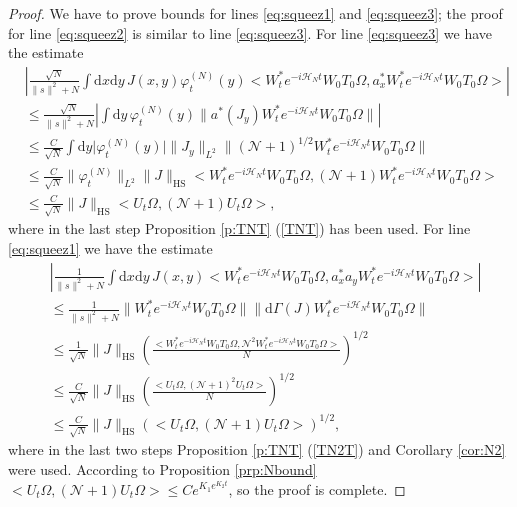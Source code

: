 \documentclass[11pt,a4paper,DIV11]{scrartcl}	%
\newcommand{\di}{\textrm{d}}		%
\newcommand{\Ncal}{\mathcal{N}}		%
\newcommand{\Hcal}{\mathcal{H}}		%
\newcommand{\scal}[2]{\big<#1,#2\big>} %
\newcommand{\norm}[1]{\lVert#1\rVert}	%
\newcommand{\ph}{\varphi_t^{(N)}}	%
\newcommand{\HS}{_{\textrm{HS}}}
\begin{document}
\begin{proof}
We have to prove bounds for lines \eqref{eq:squeez1} and \eqref{eq:squeez3}; the proof for line \eqref{eq:squeez2} is similar to line \eqref{eq:squeez3}.
For line \eqref{eq:squeez3} we have the estimate
\begin{align*}
& \left\lvert \frac{\sqrt{N}}{\norm{s}^2+N} \int \di x\di y\, J(x,y) \ph(y) \scal{W^\ast_t e^{-i\Hcal_N t}W_0 T_0 \Omega}{a^\ast_x W^\ast_t e^{-i\Hcal_N t}W_0 T_0 \Omega}  \right\rvert \\
& \leq \frac{\sqrt{N}}{\norm{s}^2+N}\left\lvert \int \di y\, \ph(y) \norm{a^\ast(J_y)W^\ast_t e^{-i\Hcal_N t} W_0 T_0 \Omega} \right\rvert\\
& \leq \frac{C}{\sqrt{N}} \int \di y \lvert \ph(y)\rvert \norm{J_y}_{L^2} \norm{(\Ncal+1)^{1/2} W^\ast_t e^{-i\Hcal_N t}W_0 T_0 \Omega} \\
& \leq \frac{C}{\sqrt{N}} \norm{\ph}_{L^2} \norm{J}\HS \scal{W^\ast_t e^{-i\Hcal_N t}W_0 T_0 \Omega}{(\Ncal+1)W^\ast_t e^{-i\Hcal_N t}W_0 T_0 \Omega} \\
& \leq \frac{C}{\sqrt{N}} \norm{J}\HS \scal{U_t \Omega}{(\Ncal+1)U_t \Omega},
\end{align*}
where in the last step Proposition \ref{p:TNT} (\ref{TNT}) has been used.
For line \eqref{eq:squeez1} we have the estimate
\begin{align*}
& \left\lvert \frac{1}{\norm{s}^2+N} \int \di x\di y\, J(x,y) \scal{W^\ast_t e^{-i\Hcal_N t}W_0 T_0 \Omega}{a^\ast_x a_y W^\ast_t e^{-i\Hcal_N t}W_0 T_0 \Omega} \right \rvert \\
& \leq \frac{1}{\norm{s}^2+N} \norm{W^\ast_t e^{-i\Hcal_N t}W_0 T_0 \Omega}\norm{\di\Gamma(J) W^\ast_t e^{-i\Hcal_N t}W_0 T_0 \Omega} \\
& \leq \frac{1}{\sqrt{N}} \norm{J}\HS \left( \frac{\scal{W^\ast_t e^{-i\Hcal_N t}W_0 T_0 \Omega}{\Ncal^2 W^\ast_t e^{-i\Hcal_N t}W_0 T_0 \Omega}}{N} \right)^{1/2} \\
& \leq \frac{C}{\sqrt{N}} \norm{J}\HS \left( \frac{\scal{U_t \Omega}{(\Ncal+1)^2 U_t \Omega}}{N} \right)^{1/2} \\
& \leq \frac{C}{\sqrt{N}} \norm{J}\HS \left( \scal{U_t \Omega}{(\Ncal+1) U_t \Omega} \right)^{1/2},
\end{align*}
where in the last two steps Proposition \ref{p:TNT} (\ref{TN2T}) and Corollary \ref{cor:N2} were used.
According to Proposition \ref{prp:Nbound} $\scal{U_t \Omega}{\left(\Ncal + 1\right) U_t \Omega} \leq C e^{K_1 e^{K_2 t}}$, so the proof is complete.
\end{proof}
\end{document}
